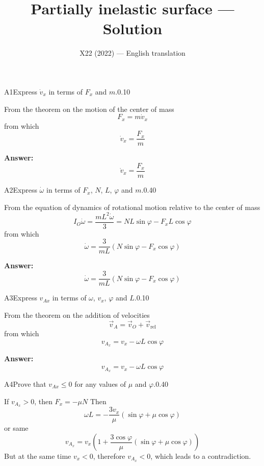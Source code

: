\documentclass[11pt,a4paper]{article}
\title{\textbf{Partially inelastic surface --- Solution}}
\author{\normalsize X22 (2022) — English translation}
\date{}
\begin{document}
\maketitle\vspace{-0.5em}
\begin{solcard}{A1}{Express $\dot{v}_x$ in terms of $F_x$ and $m$.}{0.10}

From the theorem on the motion of the center of mass $$F_x=m\dot{v}_x $$ from which $$\dot{v}_x=\frac{F_x}{m} $$

\par\smallskip\noindent\textbf{Answer:} $$\dot{v}_x=\frac{F_x}{m} $$
\end{solcard}

\begin{solcard}{A2}{Express $\dot{\omega}$ in terms of $F_x$, $N$, $L$, $\varphi$ and $m$.}{0.40}

From the equation of dynamics of rotational motion relative to the center of mass $$I_{O}\dot{\omega}=\frac{mL^2\dot{\omega}}{3}=NL\sin\varphi-F_xL\cos\varphi $$ from which $$\dot{\omega}=\frac{3}{mL}\left(N\sin\varphi-F_x\cos\varphi\right) $$

\par\smallskip\noindent\textbf{Answer:} $$\dot{\omega}=\frac{3}{mL}\left(N\sin\varphi-F_x\cos\varphi\right) $$
\end{solcard}

\begin{solcard}{A3}{Express $v_{Ax}$ in terms of $\omega$, $v_x$, $\varphi$ and $L$.}{0.10}

From the theorem on the addition of velocities $$\vec{v}_A=\vec{v}_O+\vec{v}_{\text{rel}} $$ from which $$v_{A_x}=v_x-\omega L\cos\varphi $$

\par\smallskip\noindent\textbf{Answer:} $$v_{A_x}=v_x-\omega L\cos\varphi $$
\end{solcard}

\begin{solcard}{A4}{Prove that $v_{Ax}\leq{0}$ for any values of $\mu$ and $\varphi$.}{0.40}

If $v_{A_x}>0$, then $F_x=-\mu N$ Then $$\omega L=-\frac{3v_x}{\mu}\left(\sin\varphi+\mu\cos\varphi\right) $$ or same $$v_{A_x}=v_x\left(1+\frac{3\cos\varphi}{\mu}\left(\sin\varphi+\mu\cos\varphi\right)\right) $$ But at the same time $v_x<0$, therefore $v_{A_x}<0$, which leads to a contradiction.

\end{solcard}
\end{document}
